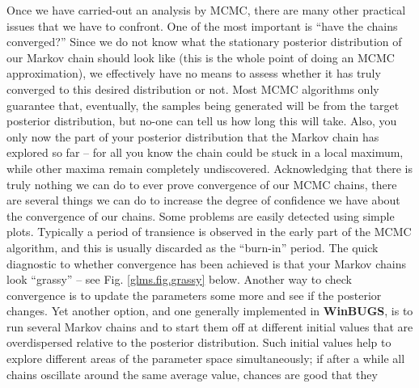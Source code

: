 Once we have carried-out an analysis by MCMC, there are many other
practical issues that we have to confront.  One of the most important
is ``have the chains converged?'' Since we do not know what the
stationary posterior distribution of our Markov chain should look like
(this is the whole point of doing an MCMC approximation), we
effectively have no means to assess whether it has truly converged to
this desired distribution or not. Most MCMC algorithms only guarantee
that, eventually, the samples being generated will be from the target
posterior distribution, but no-one can tell us how long this will
take. Also, you only now the part of your posterior distribution that
the Markov chain has explored so far -- for all you know the chain
could be stuck in a local maximum, while other maxima remain
completely undiscovered.  Acknowledging that there is truly nothing we
can do to ever prove convergence of our MCMC chains, there are several
things we can do to increase the degree of confidence we have about
the convergence of our chains. Some problems are easily detected using
simple plots.  Typically a period of transience is observed in the
early part of the MCMC algorithm, and this is usually discarded as the
``burn-in'' period. The quick diagnostic to whether convergence has
been achieved is that your Markov chains look ``grassy'' -- see Fig.
\ref{glms.fig.grassy} below.  Another way to check convergence is to
update the parameters some more and see if the posterior changes. Yet
another option, and one generally implemented in {\bf WinBUGS}, is to
run several Markov chains and to start them off at different initial
values that are overdispersed relative to the posterior
distribution. Such initial values help to explore different areas of
the parameter space simultaneously; if after a while all chains
oscillate around the same average value, chances are good that they
